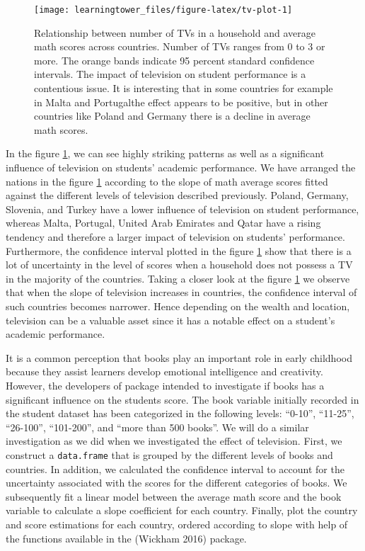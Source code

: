 \begin{figure}[H]
\texttt{[image: learningtower\_files/figure-latex/tv-plot-1]} \caption{Relationship  between number of TVs in a household and average math scores across countries. Number of TVs ranges from 0 to 3 or more. The orange bands indicate 95 percent standard confidence intervals. The impact of television on student performance is a contentious issue. It is interesting that in some countries for example in Malta and Portugalthe effect appears to be positive, but in other countries like Poland and Germany there is a decline in average math scores.}\label{fig:tv-plot}
\end{figure}

In the figure \ref{fig:tv-plot}, we can see highly striking patterns as well as a significant influence of television on students' academic performance. We have arranged the nations in the figure \ref{fig:tv-plot} according to the slope of math average scores fitted against the different levels of television described previously. Poland, Germany, Slovenia, and Turkey have a lower influence of television on student performance, whereas Malta, Portugal, United Arab Emirates and Qatar have a rising tendency and therefore a larger impact of television on students' performance. Furthermore, the confidence interval plotted in the figure \ref{fig:tv-plot} show that there is a lot of uncertainty in the level of scores when a household does not possess a TV in the majority of the countries. Taking a closer look at the figure \ref{fig:tv-plot} we observe that when the slope of television increases in countries, the confidence interval of such countries becomes narrower. Hence depending on the wealth and location, television can be a valuable asset since it has a notable effect on a student's academic performance.

It is a common perception that books play an important role in early childhood because they assist learners develop emotional intelligence and creativity. However, the developers of  package intended to investigate if books has a significant influence on the students score. The book variable initially recorded in the student dataset has been categorized in the following levels: ``0-10'', ``11-25'', ``26-100'', ``101-200'', and ``more than 500 books''. We will do a similar investigation as we did when we investigated the effect of television. First, we construct a \texttt{data.frame} that is grouped by the different levels of books and countries. In addition, we calculated the confidence interval to account for the uncertainty associated with the scores for the different categories of books. We subsequently fit a linear model between the average math score and the book variable to calculate a slope coefficient for each country. Finally, plot the country and score estimations for each country, ordered according to slope with help of the functions available in the  (Wickham 2016) package.

